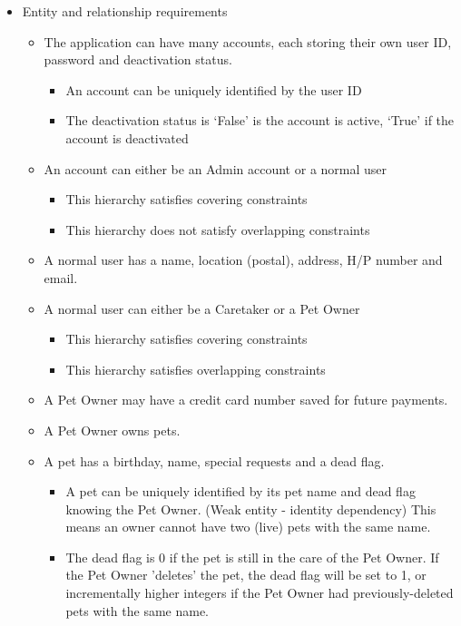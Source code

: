 \documentclass[10pt]{article}
\begin{document}
\begin{itemize}
    \item Entity and relationship requirements
    \begin{itemize}
        \item The application can have many accounts, each storing their own user ID, password and deactivation status.
	    \begin{itemize}
	        \item An account can be uniquely identified by the user ID
	        \item The deactivation status is `False' is the account is active, `True' if the account is deactivated
	    \end{itemize}
        \item An account can either be an Admin account or a normal user
	    \begin{itemize}
	        \item This hierarchy satisfies covering constraints
	        \item This hierarchy does not satisfy overlapping constraints
	    \end{itemize}
		\item A normal user has a name, location (postal), address, H/P number and email.
        \item A normal user can either be a Caretaker or a Pet Owner
        \begin{itemize}
	        \item This hierarchy satisfies covering constraints
	        \item This hierarchy satisfies overlapping constraints
	    \end{itemize}
        \item A Pet Owner may have a credit card number saved for future payments.
        \item A Pet Owner owns pets.
        \item A pet has a birthday, name, special requests and a dead flag.
        \begin{itemize}
            \item A pet can be uniquely identified by its pet name and dead flag knowing the Pet Owner. (Weak entity - identity dependency) This means an owner cannot have two (live) pets with the same name.
            \item The dead flag is 0 if the pet is still in the care of the Pet Owner. If the Pet Owner 'deletes' the pet, the dead flag will be set to 1, or incrementally higher integers if the Pet Owner had previously-deleted pets with the same name.

\end{itemize}
\end{itemize}
\end{itemize}
\end{document}
